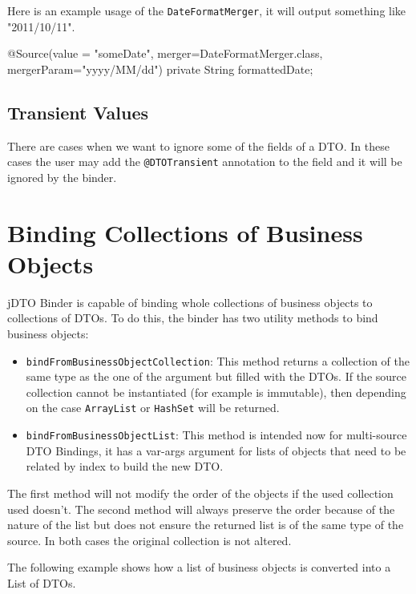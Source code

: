\documentclass[11pt]{article}
\newcommand{\JDTO}{jDTO Binder\xspace}
\begin{document}
Here is an example usage of the \texttt{DateFormatMerger}, it will output something like "2011/10/11".


\begin{java}
@Source(value = "someDate", 
    merger=DateFormatMerger.class, mergerParam="yyyy/MM/dd")
private String formattedDate;
\end{java}

\subsection{Transient Values}


There are cases when we want to ignore some of the fields of a DTO. In these cases the user may add the \texttt{@DTOTransient} annotation to the field and it will be ignored by the binder.

\section{Binding Collections of Business Objects}


\JDTO is capable of binding whole collections of business objects to collections of DTOs. To do this, the binder has two utility methods to bind business objects:

\begin{itemize}
\item \texttt{bindFromBusinessObjectCollection}: This method returns a collection of the same type as the one of the argument but filled with the DTOs. If the source collection cannot be instantiated (for example is immutable), then depending on the case \texttt{ArrayList} or \texttt{HashSet} will be returned.

\item \texttt{bindFromBusinessObjectList}: This method is intended now for multi-source DTO Bindings, it has a var-args argument for lists of objects that need to be related by index to build the new DTO.

\end{itemize}

The first method will not modify the order of the objects if the used collection used doesn't. The second method will always preserve the order because of the nature of the list but does not ensure the returned list is of the same type of the source. In both cases the original collection is not altered.

The following example shows how a list of business objects is converted into a List of DTOs.
\end{document}
